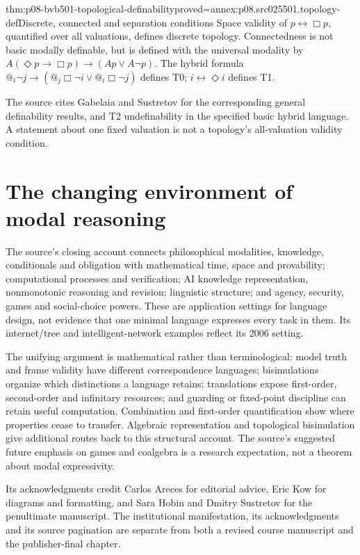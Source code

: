 \begin{hbtheorem}{thm:p08-bvb501-topological-definability}{proved=annex:p08.src025501.topology-def}{Discrete, connected and separation conditions}
Space validity of \(p\leftrightarrow\Box p\), quantified over
all valuations, defines discrete topology. Connectedness is not basic
modally definable, but is defined with the universal modality by
\(A(\Diamond p\to\Box p)\to(Ap\lor A\neg p)\).
The hybrid formula \(@_i\neg j\to(@_j\Box\neg i\lor @_i\Box\neg j)\)
defines T0; \(i\leftrightarrow\Diamond i\) defines T1.
\end{hbtheorem}

The source cites Gabelaia and Sustretov for the corresponding general
definability results, and T2 undefinability in the specified basic hybrid
language. A statement about one fixed valuation is not a topology's
all-valuation validity condition.

\section{The changing environment of modal reasoning}
\label{sec:p08-bvb501-environment}

The source's closing account connects philosophical modalities,
knowledge, conditionals and obligation with mathematical time, space
and provability; computational processes and verification; AI knowledge
representation, nonmonotonic reasoning and revision; linguistic structure;
and agency, security, games and social-choice powers. These are application
settings for language design, not evidence that one minimal language
expresses every task in them. Its internet/tree and intelligent-network
examples reflect its 2006 setting.

The unifying argument is mathematical rather than terminological:
model truth and frame validity have different correspondence languages;
bisimulations organize which distinctions a language retains;
translations expose first-order, second-order and infinitary resources;
and guarding or fixed-point discipline can retain useful computation.
Combination and first-order quantification show where properties cease
to transfer. Algebraic representation and topological bisimulation give
additional routes back to this structural account. The source's suggested
future emphasis on games and coalgebra is a research expectation, not
a theorem about modal expressivity.

Its acknowledgments credit Carlos Areces for editorial advice, Eric Kow
for diagrams and formatting, and Sara Hobin and Dmitry Sustretov for
the penultimate manuscript. The institutional manifestation, its
acknowledgments and its source pagination are separate from both a
revised course manuscript and the publisher-final chapter.

